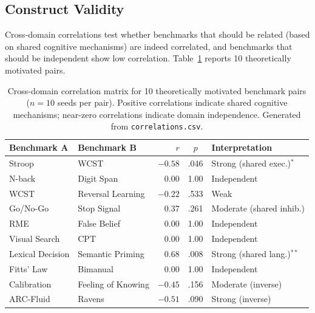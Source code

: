 \documentclass[11pt,letterpaper]{article}
\begin{document}
\subsection{Construct Validity}

Cross-domain correlations test whether benchmarks that should be related (based on shared cognitive mechanisms) are indeed correlated, and benchmarks that should be independent show low correlation. Table~\ref{tab:correlations} reports 10 theoretically motivated pairs.

\begin{table}[t]
\centering
\caption{Cross-domain correlation matrix for 10 theoretically motivated benchmark pairs ($n = 10$ seeds per pair). Positive correlations indicate shared cognitive mechanisms; near-zero correlations indicate domain independence. Generated from \texttt{correlations.csv}.}
\label{tab:correlations}
\small
\begin{tabular}{@{}llrcl@{}}
\toprule
\textbf{Benchmark A} & \textbf{Benchmark B} & \textbf{$r$} & \textbf{$p$} & \textbf{Interpretation} \\
\midrule
Stroop             & WCST               & $-0.58$ & .046 & Strong (shared exec.)$^*$ \\
N-back             & Digit Span         &  $0.00$ & 1.00 & Independent \\
WCST               & Reversal Learning  & $-0.22$ & .533 & Weak \\
Go/No-Go           & Stop Signal        &  $0.37$ & .261 & Moderate (shared inhib.) \\
RME                & False Belief       &  $0.00$ & 1.00 & Independent \\
Visual Search      & CPT                &  $0.00$ & 1.00 & Independent \\
Lexical Decision   & Semantic Priming   &  $0.68$ & .008 & Strong (shared lang.)$^{**}$ \\
Fitts' Law         & Bimanual           &  $0.00$ & 1.00 & Independent \\
Calibration        & Feeling of Knowing & $-0.45$ & .156 & Moderate (inverse) \\
ARC-Fluid          & Ravens             & $-0.51$ & .090 & Strong (inverse) \\
\bottomrule
\end{tabular}
\end{table}
\end{document}
